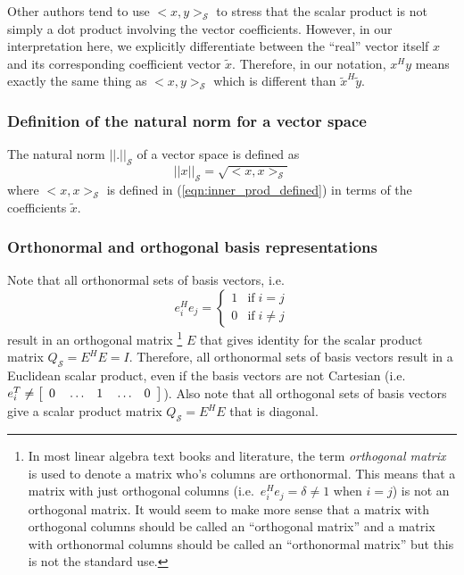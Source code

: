Other authors tend to use $<x,y>_{\mathcal{S}}$ to stress that the scalar
product is not simply a dot product involving the vector coefficients.
However, in our interpretation here, we explicitly differentiate between the
``real'' vector itself $x$ and its corresponding coefficient vector
$\tilde{x}$.  Therefore, in our notation, $x^H y$ means exactly the same thing
as $<x,y>_{\mathcal{S}}$ which is different than $\tilde{x}^H {}\tilde{y}$.

\subsubsection{Definition of the natural norm for a vector space}

The natural norm $||.||_{\mathcal{S}}$ of a vector space is defined as
%
\begin{equation}
||x||_{\mathcal{S}} = \sqrt{<x,x>_{\mathcal{S}}}
\label{eqn:natural_norm_defined}
\end{equation}
%
where $<x,x>_{\mathcal{S}}$ is defined in (\ref{eqn:inner_prod_defined}) in
terms of the coefficients $\tilde{x}$.

\subsubsection{Orthonormal and orthogonal basis representations}

Note that all orthonormal sets of basis vectors, i.e.
\[
e_i^H e_j = \left\{ \begin{array}{ll} 1 & \mbox{if} \; i = j \\ 0 & \mbox{if} \; i \ne j \end{array}  \right.
\]
result in an orthogonal matrix
%
\footnote{In most linear algebra text books and
literature, the term {}\textit{orthogonal matrix} is used to denote a matrix
who's columns are orthonormal.  This means that a matrix with just orthogonal
columns (i.e.\ $e_i^H e_j = \delta \ne 1$ when $i=j$) is not an orthogonal
matrix.  It would seem to make more sense that a matrix with orthogonal
columns should be called an ``orthogonal matrix'' and a matrix with
orthonormal columns should be called an ``orthonormal matrix'' but this is not
the standard use.}
%
$E$ that gives identity for the scalar product matrix $Q_{\mathcal{S}} = E^H E
= I$.  Therefore, all orthonormal sets of basis vectors result in a Euclidean
scalar product, even if the basis vectors are not Cartesian (i.e.\ $e_i^T
{}\ne {\bmat{ccccc} 0 & {}\ldots & 1 & {}\ldots & 0 {}\emat}$). Also note that
all orthogonal sets of basis vectors give a scalar product matrix
$Q_{\mathcal{S}} = E^H E$ that is diagonal.

